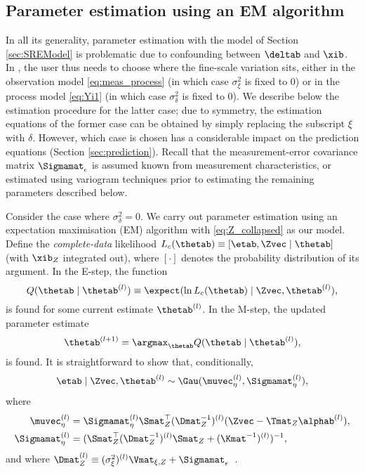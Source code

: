 \subsection{Parameter estimation using an EM algorithm} \label{sec:estimation}

In all its generality, parameter estimation with the model of Section \ref{sec:SREModel} is problematic due to confounding between $\deltab$ and $\xib$. In , the user thus needs to choose where the fine-scale variation sits, either in the observation model \eqref{eq:meas_process} (in which case $\sigma^2_\xi$ is fixed to 0) or in the process model \eqref{eq:Yi1} (in which case $\sigma^2_\delta$ is fixed to 0). We describe below the estimation procedure for the latter case; due to symmetry, the estimation equations of the former case can be obtained by simply replacing the subscript $\xi$ with $\delta$. However, which case is chosen has a considerable impact on the prediction equations (Section \ref{sec:prediction}). Recall that the measurement-error covariance matrix $\Sigmamat_\epsilon$ is assumed known from measurement characteristics, or estimated using variogram techniques prior to estimating the remaining parameters described below.

Consider the case where $\sigma^2_\delta = 0$. We carry out parameter estimation using an expectation maximisation (EM) algorithm \citep[similar to]{Katzfuss_2011,Nguyen_2014} with \eqref{eq:Z_collapsed} as our model. Define the \emph{complete-data} likelihood $L_c(\thetab) \equiv [\etab,\Zvec \mid \thetab]$ (with $\xib_Z$ integrated out), where $[\cdot]$ denotes the probability distribution of its argument. In the E-step, the function
\begin{equation*}
Q(\thetab \mid \thetab^{(l)}) \equiv \expect(\ln L_c(\thetab) \mid \Zvec,\thetab^{(l)}),
\end{equation*}
is found for some current estimate $\thetab^{(l)}$. In the M-step, the updated parameter estimate
\begin{equation*}
\thetab^{(l+1)} = \argmax_\thetab Q(\thetab \mid \thetab^{(l)}),
\end{equation*}
is found. It is straightforward to show that, conditionally,
\begin{equation*}
\etab \mid \Zvec,\thetab^{(l)} \sim \Gau(\muvec_\eta^{(l)},\Sigmamat_\eta^{(l)}),
\end{equation*}
where
\begin{align*}
\muvec_\eta^{(l)} &= \Sigmamat_\eta^{(l)} \Smat_Z^\top(\Dmat_Z^{-1})^{(l)}(\Zvec - \Tmat_Z\alphab^{(l)}), \\
\Sigmamat_\eta^{(l)} &= (\Smat_Z^\top(\Dmat_Z^{-1})^{(l)}\Smat_Z + (\Kmat^{-1})^{(l)})^{-1},
\end{align*}
and where $\Dmat_Z^{(l)} \equiv (\sigma^2_\xi)^{(l)} \Vmat_{\xi,Z} + \Sigmamat_\epsilon$~.

